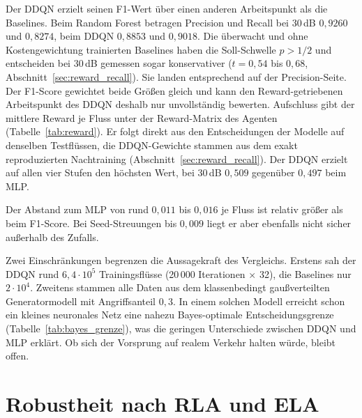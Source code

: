 Der DDQN erzielt seinen F1-Wert über einen anderen Arbeitspunkt als die Baselines. Beim Random Forest betragen Precision und Recall bei 30\,dB $0{,}9260$ und $0{,}8274$, beim DDQN $0{,}8853$ und $0{,}9018$. Die überwacht und ohne Kostengewichtung trainierten Baselines haben die Soll-Schwelle $p>1/2$ und entscheiden bei 30\,dB gemessen sogar konservativer ($t=0{,}54$ bis $0{,}68$, Abschnitt~\ref{sec:reward_recall}). Sie landen entsprechend auf der Precision-Seite. Der F1-Score gewichtet beide Größen gleich und kann den Reward-getriebenen Arbeitspunkt des DDQN deshalb nur unvollständig bewerten. Aufschluss gibt der mittlere Reward je Fluss unter der Reward-Matrix des Agenten (Tabelle~\ref{tab:reward}). Er folgt direkt aus den Entscheidungen der Modelle auf denselben Testflüssen, die DDQN-Gewichte stammen aus dem exakt reproduzierten Nachtraining (Abschnitt~\ref{sec:reward_recall}). Der DDQN erzielt auf allen vier Stufen den höchsten Wert, bei 30\,dB $0{,}509$ gegenüber $0{,}497$ beim MLP.

\begin{table}[htbp]
	\centering
	\small
	\setlength{\tabcolsep}{4pt}
	\renewcommand{\arraystretch}{1.2}
	\caption[Mittlerer Reward je Fluss unter der Reward-Matrix]{Mittlerer Reward je Fluss unter der Reward-Matrix des Agenten ($R_{\mathrm{TP}}=+1$, $R_{\mathrm{TN}}=+0{,}5$, $R_{\mathrm{FP}}=-1$, $R_{\mathrm{FN}}=-2$), Mittelwert $\pm$ Standardabweichung über drei Seeds mit je $20\,000$ Testflüssen. Fettdruck: höchster Mittelwert je Stufe.}
	\label{tab:reward}
	
\end{table}

 Der Abstand zum MLP von rund $0{,}011$ bis $0{,}016$ je Fluss ist relativ größer als beim F1-Score. Bei Seed-Streuungen bis $0{,}009$ liegt er aber ebenfalls nicht sicher außerhalb des Zufalls.

Zwei Einschränkungen begrenzen die Aussagekraft des Vergleichs. Erstens sah der DDQN rund $6{,}4\cdot 10^{5}$ Trainingsflüsse (20\,000 Iterationen $\times$ 32), die Baselines nur $2\cdot 10^{4}$. Zweitens stammen alle Daten aus dem klassenbedingt gaußverteilten Generatormodell mit Angriffsanteil $0{,}3$. In einem solchen Modell erreicht schon ein kleines neuronales Netz eine nahezu Bayes-optimale Entscheidungsgrenze (Tabelle~\ref{tab:bayes_grenze}), was die geringen Unterschiede zwischen DDQN und MLP erklärt. Ob sich der Vorsprung auf realem Verkehr halten würde, bleibt offen.

\section{Robustheit nach RLA und ELA}
\label{sec:robustheit_rla_ela}

